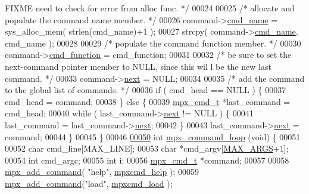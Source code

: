 \begin{DoxyCode}
{      FIXME need to check for error from alloc func. */}
00024 
00025         \textcolor{comment}{/* allocate and populate the command name member. */}
00026         command->\hyperlink{structmpx__cmd_aeae73296151ffcec319820f4d8399e51}{cmd_name} = sys\_alloc\_mem( strlen(cmd\_name)+1 );
00027         strcpy( command->\hyperlink{structmpx__cmd_aeae73296151ffcec319820f4d8399e51}{cmd_name}, cmd\_name );
00028 
00029         \textcolor{comment}{/* populate the command function member. */}
00030         command->\hyperlink{structmpx__cmd_ad35d459cc43aac3f75fb308e07572253}{cmd_function} = cmd\_function;
00031 
00032         \textcolor{comment}{/* be sure to set the next-command pointer member to NULL, since this wil
      l be the new last command. */}
00033         command->\hyperlink{structmpx__cmd_a863c991d0d31b283791615b5f5fe03bb}{next} = NULL;
00034 
00035         \textcolor{comment}{/* add the command to the global list of commands. */}
00036         \textcolor{keywordflow}{if} ( cmd\_head == NULL ) \{
00037                 cmd\_head = command;
00038         \} \textcolor{keywordflow}{else} \{
00039                 \hyperlink{structmpx__cmd}{mpx_cmd_t} *last\_command = cmd\_head;
00040                 \textcolor{keywordflow}{while} ( last\_command->\hyperlink{structmpx__cmd_a863c991d0d31b283791615b5f5fe03bb}{next} != NULL ) \{
00041                         last\_command = last\_command->\hyperlink{structmpx__cmd_a863c991d0d31b283791615b5f5fe03bb}{next};
00042                 \}
00043                 last\_command->\hyperlink{structmpx__cmd_a863c991d0d31b283791615b5f5fe03bb}{next} = command;
00044         \}
00045 \}
00046 
\hypertarget{mpx__cmd_8c_source_l00050}{}\hyperlink{mpx__cmd_8h_ab2f64c5ce0432edca230a87739501703}{00050} \textcolor{keywordtype}{int} \hyperlink{mpx__cmd_8c_ab2f64c5ce0432edca230a87739501703}{mpx_command_loop} (\textcolor{keywordtype}{void}) \{
00051 
00052         \textcolor{keywordtype}{char} cmd\_line[MAX\_LINE];
00053         \textcolor{keywordtype}{char} *cmd\_argv[\hyperlink{mpx__cmd_8h_a29b7451465deac204c5f7cb1f9c6e1fc}{MAX_ARGS}+1];
00054         \textcolor{keywordtype}{int}  cmd\_argc;
00055         \textcolor{keywordtype}{int}  i;
00056         \hyperlink{structmpx__cmd}{mpx_cmd_t} *command;
00057 
00058         \hyperlink{mpx__cmd_8c_a52c02eb85fda9ac4278e10088a192e89}{mpx_add_command}( \textcolor{stringliteral}{"help"}, \hyperlink{mpx__cmd_8c_ae9b1349cfcfc34815e87cae5330660e8}{mpxcmd_help} );
00059         \hyperlink{mpx__cmd_8c_a52c02eb85fda9ac4278e10088a192e89}{mpx_add_command}(\textcolor{stringliteral}{"load"}, \hyperlink{mpx__cmd_8c_ab121952706478a3ce5951ab91298d391}{mpxcmd_load} );

\end{DoxyCode}
